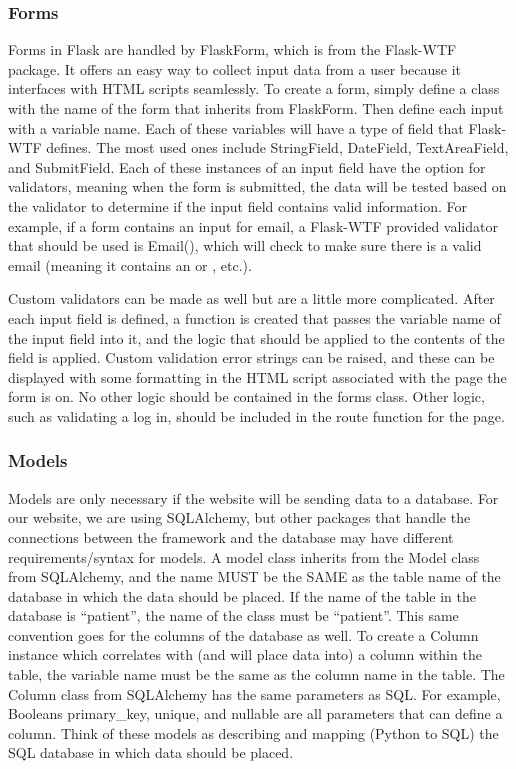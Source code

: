 \documentclass[]{book}
\begin{document}
\subsubsection{Forms}\label{forms}

Forms in Flask are handled by FlaskForm, which is from the Flask-WTF
package. It offers an easy way to collect input data from a user because
it interfaces with HTML scripts seamlessly. To create a form, simply
define a class with the name of the form that inherits from FlaskForm.
Then define each input with a variable name. Each of these variables
will have a type of field that Flask-WTF defines. The most used ones
include StringField, DateField, TextAreaField, and SubmitField. Each of
these instances of an input field have the option for validators,
meaning when the form is submitted, the data will be tested based on the
validator to determine if the input field contains valid information.
For example, if a form contains an input for email, a Flask-WTF provided
validator that should be used is Email(), which will check to make sure
there is a valid email (meaning it contains an \citet{website.com} or
\citet{website.org}, etc.).

Custom validators can be made as well but are a little more complicated.
After each input field is defined, a function is created that passes the
variable name of the input field into it, and the logic that should be
applied to the contents of the field is applied. Custom validation error
strings can be raised, and these can be displayed with some formatting
in the HTML script associated with the page the form is on. No other
logic should be contained in the forms class. Other logic, such as
validating a log in, should be included in the route function for the
page.

\subsubsection{Models}\label{models}

Models are only necessary if the website will be sending data to a
database. For our website, we are using SQLAlchemy, but other packages
that handle the connections between the framework and the database may
have different requirements/syntax for models. A model class inherits
from the Model class from SQLAlchemy, and the name MUST be the SAME as
the table name of the database in which the data should be placed. If
the name of the table in the database is ``patient'', the name of the
class must be ``patient''. This same convention goes for the columns of
the database as well. To create a Column instance which correlates with
(and will place data into) a column within the table, the variable name
must be the same as the column name in the table. The Column class from
SQLAlchemy has the same parameters as SQL. For example, Booleans
primary\_key, unique, and nullable are all parameters that can define a
column. Think of these models as describing and mapping (Python to SQL)
the SQL database in which data should be placed.
\end{document}
